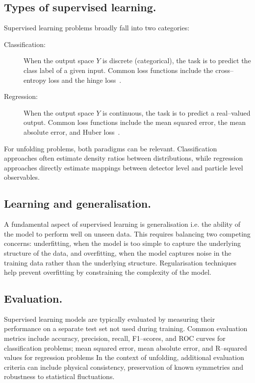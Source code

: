     \subsection{Types of supervised learning.}
        Supervised learning problems broadly fall into two categories:
        \begin{description}
            \item[Classification:]
            When the output space \({Y}\) is discrete (categorical), the task is to predict the class label of a given input.
            Common loss functions include the cross--entropy loss and the hinge loss~\cite{rosascoAreLossFunctions2004}.
            \item[Regression:]
            When the output space \({Y}\) is continuous, the task is to predict a real--valued output.
            Common loss functions include the mean squared error, the mean absolute error, and Huber loss~\cite{huberRobustEstimationLocation1964}.
        \end{description}
        For unfolding problems, both paradigms can be relevant.
        Classification approaches often estimate density ratios between distributions, while regression approaches directly estimate mappings between detector level and particle level observables.
        
    \subsection{Learning and generalisation.}
        A fundamental aspect of supervised learning is generalisation i.e. the ability of the model to perform well on unseen data.
        This requires balancing two competing concerns: underfitting, when the model is too simple to capture the underlying structure of the data, and overfitting, when the model captures noise in the training data rather than the underlying structure.
        Regularisation techniques help prevent overfitting by constraining the complexity of the model.

    \subsection{Evaluation.}
        Supervised learning models are typically evaluated by measuring their performance on a separate test set not used during training.
        Common evaluation metrics include accuracy, precision, recall, F1--scores, and ROC curves for classification problems; mean squared error, mean absolute error, and R--squared values for regression problems
        In the context of unfolding, additional evaluation criteria can include physical consistency, preservation of known symmetries and robustness to statistical fluctuations.
        

